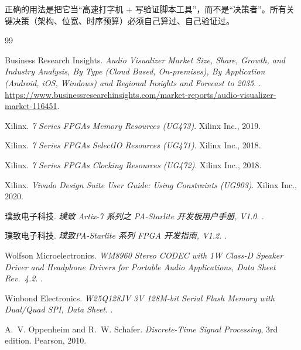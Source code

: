 \documentclass[withoutpreface,bwprint]{cumcmthesis}
\begin{document}
正确的用法是把它当“高速打字机 + 写验证脚本工具”，而不是“决策者”。所有关键决策（架构、位宽、时序预算）必须自己算过、自己验证过。

\newpage
\begin{thebibliography}{99}

Business Research Insights.
\newblock \textit{Audio Visualizer Market Size, Share, Growth, and Industry
  Analysis, By Type (Cloud Based, On-premises), By Application (Android, iOS,
  Windows) and Regional Insights and Forecast to 2035}.
.
\url{https://www.businessresearchinsights.com/market-reports/audio-visualizer-market-116451}.

Xilinx.
\newblock \textit{7 Series FPGAs Memory Resources (UG473)}.
\newblock Xilinx Inc., 2019.

Xilinx.
\newblock \textit{7 Series FPGAs SelectIO Resources (UG471)}.
\newblock Xilinx Inc., 2018.

Xilinx.
\newblock \textit{7 Series FPGAs Clocking Resources (UG472)}.
\newblock Xilinx Inc., 2018.

Xilinx.
\newblock \textit{Vivado Design Suite User Guide: Using Constraints (UG903)}.
\newblock Xilinx Inc., 2020.


%

璞致电子科技.
\newblock \textit{璞致 Artix-7 系列之 PA-Starlite 开发板用户手册, V1.0}.
.

璞致电子科技.
\newblock \textit{璞致PA-Starlite 系列 FPGA 开发指南, V1.2}.
.

Wolfson Microelectronics.
\newblock \textit{WM8960 Stereo CODEC with 1W Class-D Speaker Driver and Headphone Drivers for Portable Audio Applications, Data Sheet Rev.~4.2}.
.

Winbond Electronics.
\newblock \textit{W25Q128JV 3V 128M-bit Serial Flash Memory with Dual/Quad SPI, Data Sheet}.
.

A.~V. Oppenheim and R.~W. Schafer.
\newblock \textit{Discrete-Time Signal Processing}, 3rd edition.
\newblock Pearson, 2010.

\end{thebibliography}
\end{document}
